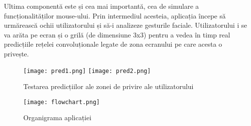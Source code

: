 Ultima componentă este și cea mai importantă, cea de simulare a funcționalităților mouse-ului.
Prin intermediul acesteia, aplicația începe să urmărească ochii utilizatorului și să-i analizeze gesturile faciale.
Utilizatorului i se va arăta pe ecran și o grilă (de dimensiune 3x3) pentru a vedea în timp real predicțiile rețelei convoluționale legate de zona ecranului pe care acesta o privește.

\begin{figure}[H]
    \centering
    \texttt{[image: pred1.png]}
    \texttt{[image: pred2.png]}
    \caption{Testarea predicțiilor ale zonei de privire ale utilizatorului}
\end{figure}

\begin{figure}[ht]
    \centering
    \texttt{[image: flowchart.png]}
    \caption{Organigrama aplicației}
\end{figure}
